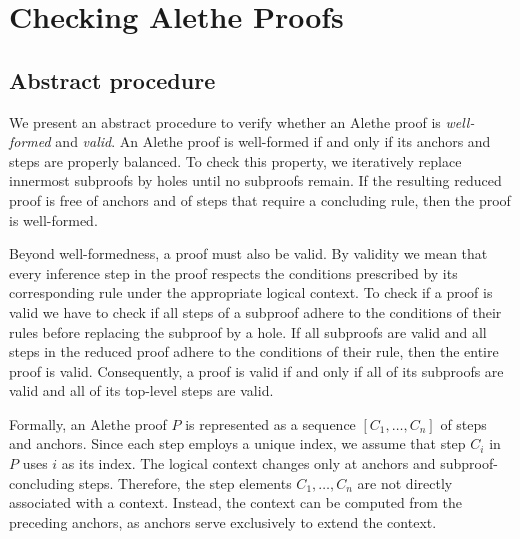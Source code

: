 
\section{Checking Alethe Proofs}

\subsection{Abstract procedure}

We present an abstract procedure to verify whether an Alethe proof is \emph{well-formed} and \emph{valid}.
An Alethe proof is well-formed if and only if its anchors and steps are properly balanced.
To check this property, we iteratively replace innermost subproofs by holes until no subproofs remain.
If the resulting reduced proof is free of anchors and of steps that require a concluding rule, then the proof is well-formed.


Beyond well-formedness, a proof must also be valid.
By validity we mean that every inference step in the proof respects the conditions prescribed by its corresponding rule under the appropriate logical context.
To check if a proof is valid we have to check if all steps of a subproof adhere to the conditions of their rules before replacing the subproof by a hole.
If all subproofs are valid and all steps in the reduced proof adhere to the conditions of their rule, then the entire proof is valid.
Consequently, a proof is valid if and only if all of its subproofs are valid and all of its top-level steps are valid.

Formally, an Alethe proof $P$ is represented as a sequence $[C_1, \ldots, C_n]$ of steps and anchors.
Since each step employs a unique index, we assume that step $C_i$ in $P$ uses
$i$ as its index. The logical context changes only at anchors and subproof-concluding
steps. Therefore, the step elements $C_1, \ldots, C_n$ are not directly associated
with a context. Instead, the context can be computed from the preceding anchors,
as anchors serve exclusively to extend the context.


